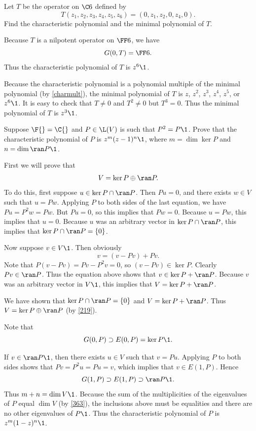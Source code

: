 \exercise
Let $T$ be the operator on $\C6$ defined by
\[
T(z_1, z_2, z_3, z_4, z_5, z_6) = (0, z_1, z_2, 0, z_4, 0).
\]
Find the characteristic polynomial and the minimal polynomial of $T$.

\begin{Solution}
Because $T$ is a nilpotent operator on $\FF6$, we have
\[
G(0, T) = \FF6.
\]
Thus the characteristic polynomial of $T$ is $z^6\1$.

Because the characteristic polynomial is a polynomial multiple of the minimal polynomial (by \ref{charmult}), the minimal polynomial of $T$ is $z$, $z^2$, $z^3$, $z^4$, $z^5$, or $z^6\1$. It is easy to check that $T \ne 0$ and  $T^2 \ne 0$ but $T^3 = 0$. Thus the minimal polynomial of $T$ is $z^3\1$.
\end{Solution}

\exercise
Suppose $\F{} = \C{}$ and $P \in \L(V)$ is such that $P^2 = P\1$. Prove that the characteristic polynomial of $P$ is $z^m (z-1)^n\1$, where $m = \dim \ker P$ and $n = \dim \ran P\1$.\label{8P2}

\begin{Solution}
First we will prove that
\[
V = \ker P \oplus \ran P.
\]
To do this, first suppose $u \in \ker P \cap \ran P$.  Then $Pu = 0$, and there exists
$w \in V$ such that $u = Pw$.  Applying $P$ to both sides of the last equation, we
have $Pu = P^2 w = Pw$.  But $Pu = 0$, so this implies that
$Pw = 0$.  Because $u = Pw$, this implies that $u = 0$.  Because $u$ was an
arbitrary vector in $\ker P \cap \ran P$, this implies that $\ker P \cap \ran P = \{0\}$.

Now suppose $v \in V\1$.  Then obviously
\[
v = (v - Pv) + Pv.
\]
Note that $P(v - Pv) = Pv - P^2v = 0$, so $(v - Pv) \in \ker P$.  Clearly
$Pv \in \ran P$.  Thus the equation above shows that $v \in \ker P + \ran P$.
Because $v$ was an arbitrary vector in $V\1$, this implies that
$V = \ker P + \ran P$.

We have shown that $\ker P \cap \ran P = \{0\}$ and $V = \ker P + \ran P$.  Thus
$V = \ker P \oplus \ran P$ (by \ref{219}).

Note that
\[
G(0, P) \supset E(0, P) = \ker P\1.
\]

If $v \in \ran P\1$, then there exists $u \in V$ such that $v = Pu$. Applying $P$ to both sides shows that
$
Pv = P^2 u = Pu = v$,
which implies that $v \in E(1, P)$. Hence
\[
G(1, P) \supset E(1, P) \supset \ran P\1.
\]
Thus $m + n = \dim V\1$. Because the sum of the multiplicities of the eigenvalues of $P$ equal $\dim V$ (by \ref{363}), the inclusions above must be equalities and there are no other eigenvalues of $P\1$. Thus the characteristic polynomial of $P$ is $z^m(1-z)^n\1$.
\end{Solution}

